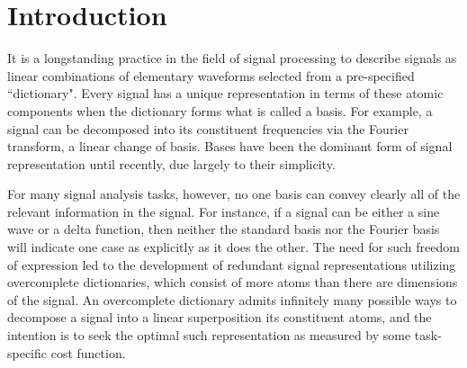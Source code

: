 \chapter{Introduction}\label{Intro}




It is a longstanding practice in the field of signal processing to describe signals as linear combinations of elementary waveforms selected from a pre-specified ``dictionary". Every signal has a unique representation in terms of these atomic components when the dictionary forms what is called a basis. For example, a signal can be decomposed into its constituent frequencies via the Fourier transform, a linear change of basis. %
Bases have been the dominant form of signal representation until recently, due largely to their simplicity. 

For many signal analysis tasks, however, no one basis can convey clearly all of the relevant information in the signal. For instance, if a signal can be either a sine wave or a delta function, then neither the standard basis nor the Fourier basis will indicate one case as explicitly as it does the other. 
The need for such freedom of expression led to the development of redundant signal representations utilizing overcomplete dictionaries, which consist of more atoms than there are dimensions of the signal. An overcomplete dictionary admits infinitely many possible ways to decompose a signal into a linear superposition its constituent atoms, and the intention is to seek the optimal such representation as measured by some task-specific cost function. 

